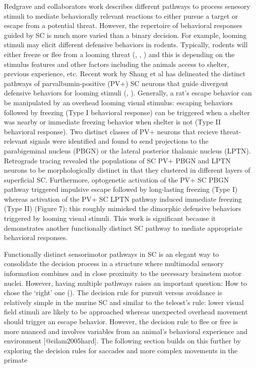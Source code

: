 \documentclass{ar-1col}
\begin{document}
{Redgrave and collaborators work describes different pathways to process senesory stimuli to mediate behaviorally relevant reactions to either pursue a target or escape from a potential threat. However, the repertoire of behavioral responses guided by SC is much more varied than a binary decision. For example, looming stimuli may elicit different defensive behaviors in rodents. Typically, rodents will either freeze or flee from a looming threat (\cite{eilam2005hard}, \cite{yilmaz2013rapid}, \cite{de2016vision}) and this is depending on the stimulus features and other factors including the animals access to shelter, previous experience, etc. Recent work by Shang et al has delineated the distinct pathways of parvalbumin-positive (PV+) SC neurons that guide divergent defensive behaviors for looming stimuli (\cite{shang2015parvalbumin}, \cite{shang2018divergent}). Generally, a rat’s escape behavior can be manipulated by an overhead looming visual stimulus: escaping behaviors followed by freezing (Type I behavioral response) can be triggered when a shelter was nearby or immediate freezing behavior when shelter is not (Type II behavioral response). Two distinct classes of PV+ neurons that recieve threat-relevant signals were identified and found to send projections to the parabigeminal nucleus (PBGN) or the lateral posterior thalamic nucleus (LPTN). Retrograde tracing revealed the populations of SC PV+ PBGN and LPTN neurons to be morphologically distinct in that they clustered in different layers of superficial SC. Furthermore, optogenetic activation of the PV+ SC PBGN pathway triggered impulsive escape followed by long-lasting freezing (Type I) whereas activation of the PV+ SC LPTN pathway induced immediate freezing (Type II) (Figure 7); this roughly mimicked the dimorphic defensive behaviors triggered by looming visual stimuli. This work is significant because it demonstrates another functionally distinct SC pathway to mediate appropriate behavioral responses.

Functionally distinct sensorimotor pathways in SC is an elegant way to consolidate the decision process in a structure where multimodal sensory information combines and in close proximity to the necessary brainstem motor nuclei. However, having multiple pathways raises an important question: How to chose the ‘right’ one (\cite{redgrave1999basal}). The decision rule for pursuit versus avoidance is relatively simple in the murine SC and similar to the teleost’s rule: lower visual field stimuli are likely to be approached whereas unexpected overhead movement should trigger an escape behavior. However, the decision rule to flee or free is more nuanced and involves variables from an animal’s behavioral experience and environment [@eilam2005hard]. The following section builds on this further by exploring the decision rules for saccades and more complex movements in the primate

}
\end{document}
